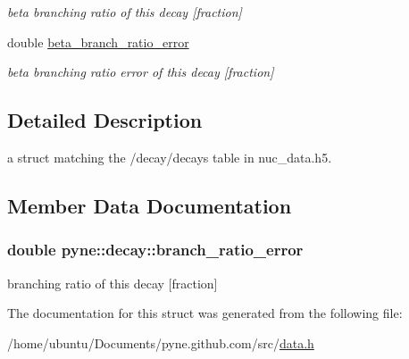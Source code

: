 \begin{DoxyCompactItemize}
\begin{DoxyCompactList}\small\item\em beta branching ratio of this decay \mbox{[}fraction\mbox{]} \end{DoxyCompactList}\item 
double \hyperlink{structpyne_1_1decay_afe2d8be6a39ee1dd7045a1970451f04e}{beta\+\_\+branch\+\_\+ratio\+\_\+error}\hypertarget{structpyne_1_1decay_afe2d8be6a39ee1dd7045a1970451f04e}{}\label{structpyne_1_1decay_afe2d8be6a39ee1dd7045a1970451f04e}

\begin{DoxyCompactList}\small\item\em beta branching ratio error of this decay \mbox{[}fraction\mbox{]} \end{DoxyCompactList}\end{DoxyCompactItemize}


\subsection{Detailed Description}
a struct matching the \textquotesingle{}/decay/decays\textquotesingle{} table in nuc\+\_\+data.\+h5. 

\subsection{Member Data Documentation}
\subsubsection[{\texorpdfstring{branch\+\_\+ratio\+\_\+error}{branch_ratio_error}}]{\setlength{\rightskip}{0pt plus 5cm}double pyne\+::decay\+::branch\+\_\+ratio\+\_\+error}\hypertarget{structpyne_1_1decay_a6df2be5724d68bfe566b53fa71320812}{}\label{structpyne_1_1decay_a6df2be5724d68bfe566b53fa71320812}
branching ratio of this decay \mbox{[}fraction\mbox{]} 

The documentation for this struct was generated from the following file\+:\begin{DoxyCompactItemize}
\item 
/home/ubuntu/\+Documents/pyne.\+github.\+com/src/\hyperlink{data_8h}{data.\+h}\end{DoxyCompactItemize}
